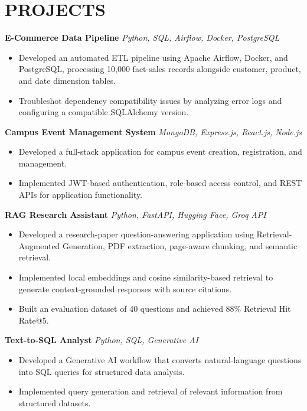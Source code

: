 \documentclass[a4paper,10pt]{article}
\begin{document}
\section*{PROJECTS}

\textbf{E-Commerce Data Pipeline}
\hfill
\textit{Python, SQL, Airflow, Docker, PostgreSQL}

\begin{itemize}
    \item Developed an automated ETL pipeline using Apache Airflow, Docker, and PostgreSQL, processing 10,000 fact-sales records alongside customer, product, and date dimension tables.
    \item Troubleshot dependency compatibility issues by analyzing error logs and configuring a compatible SQLAlchemy version.
\end{itemize}

\textbf{Campus Event Management System}
\hfill
\textit{MongoDB, Express.js, React.js, Node.js}

\begin{itemize}
    \item Developed a full-stack application for campus event creation, registration, and management.
    \item Implemented JWT-based authentication, role-based access control, and REST APIs for application functionality.
\end{itemize}

\textbf{RAG Research Assistant}
\hfill
\textit{Python, FastAPI, Hugging Face, Groq API}

\begin{itemize}
    \item Developed a research-paper question-answering application using Retrieval-Augmented Generation, PDF extraction, page-aware chunking, and semantic retrieval.
    \item Implemented local embeddings and cosine similarity-based retrieval to generate context-grounded responses with source citations.
    \item Built an evaluation dataset of 40 questions and achieved 88\% Retrieval Hit Rate@5.
\end{itemize}

\textbf{Text-to-SQL Analyst}
\hfill
\textit{Python, SQL, Generative AI}

\begin{itemize}
    \item Developed a Generative AI workflow that converts natural-language questions into SQL queries for structured data analysis.
    \item Implemented query generation and retrieval of relevant information from structured datasets.
\end{itemize}
\end{document}

